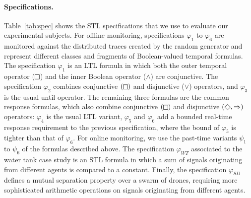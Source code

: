 \paragraph*{Specifications.}
Table~\ref{tab:spec} shows the STL specifications that we use to evaluate our experimental subjects.
For offline monitoring, specifications $\varphi_{1}$ to $\varphi_{6}$ are monitored against the distributed traces created by the random generator and represent different classes and fragments of Boolean-valued temporal formulas.
The specification $\varphi_1$ is an LTL formula in which both the outer temporal operator ($\LTLg$) and the inner Boolean operator ($\wedge$) are conjunctive.
The specification $\varphi_2$ combines conjunctive $(\LTLg)$ and disjunctive ($\lor$) operators, and $\varphi_3$ is the usual until operator.
The remaining three formulas are the common response formulas, which also combine conjunctive $(\LTLg)$ and disjunctive $(\LTLf, \Rightarrow)$ operators: $\varphi_4$ is the usual LTL variant, $\varphi_5$ and $\varphi_6$ add a bounded real-time response requirement to the previous specification, where the bound of $\varphi_5$ is tighter than that of $\varphi_6$.
For online monitoring, we use the past-time variants $\psi_1$ to $\psi_6$ of the formulas described above.
The specification $\varphi_{WT}$ associated to the water tank case study is an STL formula in which a sum of signals originating from different agents is compared to a constant. Finally, the specification $\varphi_{SD}$ defines a mutual separation property over a swarm of drones, requiring more sophisticated arithmetic operations on signals originating from different agents.

